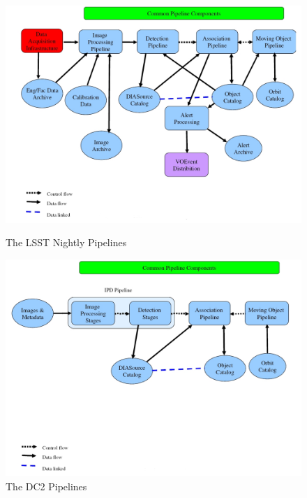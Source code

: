 \begin{figure}[htbp]
\begin{center}
\includegraphics[height=0.45\textheight] {figures/LSSTNightlyPipeline}
\caption{The LSST Nightly Pipelines\label{fComp-nite}}

\vspace{0.05\textheight}

\includegraphics[height=0.45\textheight] {figures/DC2Pipelines}
\caption{The DC2 Pipelines\label{fComp-dc2}}
\end{center}
\end{figure}


